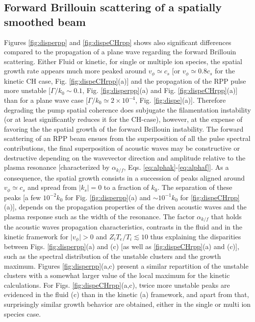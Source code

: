 \documentclass[
 reprint,
 amsmath,amssymb,
 aps,
]{revtex4-1}
\begin{document}
\subsection{Forward Brillouin scattering of a  spatially smoothed beam}
Figures \ref{fig:disperpp} and \ref{fig:dispeCHrpp} shows also significant differences compared to the propagation of a plane wave  regarding the forward Brillouin scattering.  
Either Fluid or kinetic, for single or multiple ion species, 
the spatial growth rate appears much more peaked around $v_\phi\simeq c_s$ [or $v_\phi\simeq 0.8c_s$ for  the kinetic CH case, Fig. \ref{fig:dispeCHrpp}(a)] and the propagation of the RPP pulse more unstable  [$\Gamma/k_0\sim 0.1$, Fig.  \ref{fig:disperpp}(a) and Fig.  \ref{fig:dispeCHrpp}(a)]  than for a plane wave case  [$\Gamma/k_0\simeq 2 \times 10^{-4}$, Fig.  \ref{fig:dispe}(a)].
Therefore degrading the pump spatial coherence does subjugate the filamentation instability (or at least significantly reduces it for the CH-case), however, at the expense of favoring the the spatial growth of the forward Brillouin instability.
The forward scattering of an RPP beam ensues from the superposition of all the pulse spectral contributions, the final superposition of acoustic waves may be constructive or destructive depending on the wavevector direction and amplitude relative to the plasma resonance [characterized by $\alpha_{k/f}$, Eqs. \eqref{eq:alphak}-\eqref{eq:alphaf}]. 
As a consequence, the spatial growth consists in a succession of peaks aligned around $v_\phi\simeq c_s$ and spread from $\vert k_s\vert=0$ to a fraction of $k_0$. The separation of these peaks [a few $ 10^{-2}k_0$ for Fig. \ref{fig:disperpp}(a) and $\sim 10^{-1}k_0$ for \ref{fig:dispeCHrpp}(a)], depends on the propagation properties of the driven acoustic waves and the plasma response such as the width of the resonance. 
The factor $\alpha_{k/f}$ that  holds the acoustic waves propagation characteristics, contrasts  in the fluid and in the kinetic framework for $\vert v_\phi\vert>0$ and $Z_iT_e/T_i\lesssim 10$ thus explaining the disparities between Figs. \ref{fig:disperpp}(a) and (c) [as well as  \ref{fig:dispeCHrpp}(a) and (c)], such as the spectral distribution of the unstable clusters and the growth maximum. 
Figures \ref{fig:disperpp}(a,c) present a similar repartition of the unstable clusters with a somewhat larger value of the local  maximum for the kinetic calculations. 
For Figs. \ref{fig:dispeCHrpp}(a,c),
twice more unstable peaks are evidenced in the fluid  (c) than in the kinetic (a) framework, and apart from that,  surprisingly similar growth behavior are obtained, either in the single or multi ion species case. 
\end{document}
